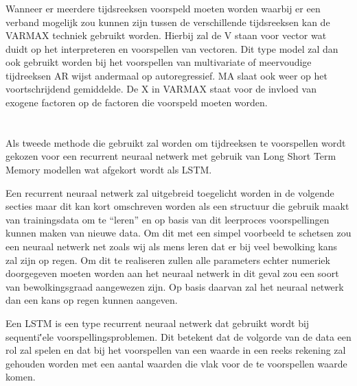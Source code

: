 \subsubsection{}
Wanneer er meerdere tijdsreeksen voorspeld moeten worden waarbij er een verband mogelijk zou kunnen zijn tussen de verschillende tijdsreeksen kan de VARMAX techniek gebruikt worden. Hierbij zal de V staan voor vector wat duidt op het interpreteren en voorspellen van vectoren. Dit type model zal dan ook gebruikt worden bij het voorspellen van multivariate of meervoudige tijdreeksen AR wijst andermaal op autoregressief. MA slaat ook weer op het voortschrijdend gemiddelde. De X in VARMAX staat voor de invloed van exogene factoren op de factoren die voorspeld moeten worden. 

\section{}
\label{subsubsec: Theoretische toelichting van long short term memory netwerken (LSTM)}

Als tweede methode die gebruikt zal worden om tijdreeksen te voorspellen wordt gekozen voor een recurrent neuraal netwerk met gebruik van Long Short Term Memory modellen wat afgekort wordt als LSTM.

Een recurrent neuraal netwerk zal uitgebreid toegelicht worden in de volgende secties maar dit kan kort omschreven worden als een structuur die gebruik maakt van trainingsdata om te ``leren'' en op basis van dit leerproces voorspellingen kunnen maken van nieuwe data. Om dit met een simpel voorbeeld te schetsen zou een neuraal netwerk net zoals wij als mens leren dat er bij veel bewolking kans zal zijn op regen. Om dit te realiseren zullen alle parameters echter numeriek doorgegeven moeten worden aan het neuraal netwerk in dit geval zou een soort van bewolkingsgraad aangewezen zijn. Op basis daarvan zal het neuraal netwerk dan een kans op regen kunnen aangeven. 

Een LSTM is een type recurrent neuraal netwerk dat gebruikt wordt bij sequenti\''{e}le voorspellingsproblemen. Dit betekent dat de volgorde van de data een rol zal spelen en dat bij het voorspellen van een waarde in een reeks rekening zal gehouden worden met een aantal waarden die vlak voor de te voorspellen waarde komen. 


\subsection{}
\label{subsec: Theretische toelichting van long short term memory netwerken (LSTM)}


